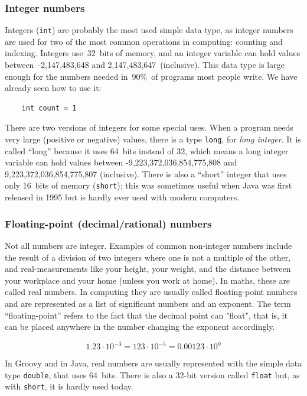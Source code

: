 \subsubsection{Integer numbers}
\label{sec:integers}

Integers (\verb+int+) are probably the most used simple data type, as
integer numbers are used for two of the most common operations in
computing: counting and indexing. Integers use~32~bits of memory, and
an integer variable can hold values between~-2,147,483,648 and
2,147,483,647~(inclusive). This data type is large enough for the
numbers needed in~90\%~of programs most people write. We have already
seen how to use it: 

\begin{verbatim}
    int count = 1
\end{verbatim}

There are two versions of integers for some special uses. When a
program needs very large (positive or negative) values, there is a
type \verb+long+, for \emph{long integer}. It is called ``long''
because it uses 64~bits instead of 32, which means a long integer
variable can hold values between -9,223,372,036,854,775,808 and
9,223,372,036,854,775,807 (inclusive). There is also a ``short''
integer that uses only 16~bits of memory (\verb+short+); this was
sometimes useful when Java was first released in 1995 but is hardly
ever used with modern computers. 

\subsubsection{Floating-point (decimal/rational) numbers}
\label{sec:float-point-decim}

Not all numbers are integer. Examples of common non-integer numbers
include the result of a division of two integers where one is not a
multiple of the other, and real-measurements like your height, your
weight, and the distance between your workplace and your home (unless
you work at home). In maths, these are called real numbers. In
computing they are usually called floating-point numbers and are
represented as a list of significant numbers and an exponent. The term
``floating-point'' refers to the fact that the decimal point can "float",
that is, it can be placed anywhere in the number changing the exponent
accordingly. 

$$ 1.23 \cdot 10^{-3} = 123 \cdot 10^{-5} = 0.00123 \cdot 10^0 $$

In Groovy and in Java, real numbers are usually represented with the
simple data type \verb+double+, that uses 64~bits. There is also a
32-bit version called \verb+float+ but, as with \verb+short+, it is
hardly used today.

